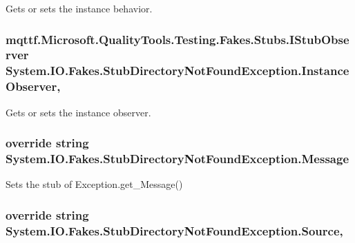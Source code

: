 Gets or sets the instance behavior.

\hypertarget{class_system_1_1_i_o_1_1_fakes_1_1_stub_directory_not_found_exception_a4f9f56df275efb65930d67f0ec57b6df}{
\subsubsection[{Instance\-Observer}]{\setlength{\rightskip}{0pt plus 5cm}mqttf.\-Microsoft.\-Quality\-Tools.\-Testing.\-Fakes.\-Stubs.\-I\-Stub\-Observer System.\-I\-O.\-Fakes.\-Stub\-Directory\-Not\-Found\-Exception.\-Instance\-Observer\hspace{0.3cm}{\ttfamily [get]}, {\ttfamily [set]}}}\label{class_system_1_1_i_o_1_1_fakes_1_1_stub_directory_not_found_exception_a4f9f56df275efb65930d67f0ec57b6df}


Gets or sets the instance observer.

\hypertarget{class_system_1_1_i_o_1_1_fakes_1_1_stub_directory_not_found_exception_a7a5df144b0a6c19a1a9d56abb2051631}{
\subsubsection[{Message}]{\setlength{\rightskip}{0pt plus 5cm}override string System.\-I\-O.\-Fakes.\-Stub\-Directory\-Not\-Found\-Exception.\-Message\hspace{0.3cm}{\ttfamily [get]}}}\label{class_system_1_1_i_o_1_1_fakes_1_1_stub_directory_not_found_exception_a7a5df144b0a6c19a1a9d56abb2051631}


Sets the stub of Exception.\-get\-\_\-\-Message()

\hypertarget{class_system_1_1_i_o_1_1_fakes_1_1_stub_directory_not_found_exception_af13b17141aae06db60ce48e9973eb16b}{
\subsubsection[{Source}]{\setlength{\rightskip}{0pt plus 5cm}override string System.\-I\-O.\-Fakes.\-Stub\-Directory\-Not\-Found\-Exception.\-Source\hspace{0.3cm}{\ttfamily [get]}, {\ttfamily [set]}}}\label{class_system_1_1_i_o_1_1_fakes_1_1_stub_directory_not_found_exception_af13b17141aae06db60ce48e9973eb16b}


